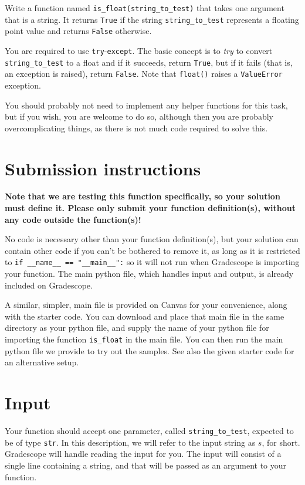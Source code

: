 
Write a function named \texttt{is\_float(string\_to\_test)}
that takes one argument that is a string.
It returns \texttt{True} if the string \texttt{string\_to\_test} represents a floating point value
and returns \texttt{False} otherwise.

You are required to use \texttt{try}-\texttt{except}.
The basic concept is to \emph{try} to convert \texttt{string\_to\_test} to a float
and if it succeeds, return \texttt{True},
but if it fails (that is, an exception is raised), return \texttt{False}.
Note that \texttt{float()} raises a \texttt{ValueError} exception.

You should probably not need to implement any helper functions for this task,
but if you wish, you are welcome to do so,
although then you are probably overcomplicating things,
as there is not much code required to solve this.

\section*{Submission instructions}

\textbf{Note that we are testing this function specifically, so your solution must define it.
Please only submit your function definition(s), without any code outside the function(s)!}

No code is necessary other than your function definition(s),
but your solution can contain other code if you can't be bothered to remove it,
as long as it is restricted to
\texttt{if \_\_name\_\_ == "\_\_main\_\_":}
so it will not run when Gradescope is importing your function.
The main python file, which handles input and output, is already included on Gradescope.

A similar, simpler, main file is provided on Canvas for your convenience, along with the starter code.
You can download and place that main file in the same directory as your python file,
and supply the name of your python file for importing the function \texttt{is\_float} in the main file.
You can then run the main python file we provide to try out the samples.
See also the given starter code for an alternative setup.

\section*{Input}

Your function should accept one parameter,
called \texttt{string\_to\_test},
expected to be of type \texttt{str}.
In this description, we will refer to the input string as $s$, for short.
Gradescope will handle reading the input for you.
The input will consist of a single line containing a string,
and that will be passed as an argument to your function.

